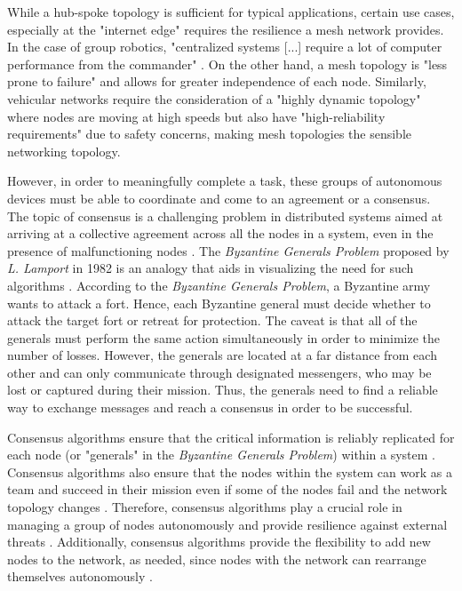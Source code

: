 While a hub-spoke topology is sufficient for typical applications, certain use cases, especially at the "internet edge" \cite{howardCoracleEvaluatingConsensus2015} requires the resilience a mesh network provides. In the case of group robotics, "centralized systems [...] require a lot of computer performance from the commander" \cite{manet_drone_semenova2015network}. On the other hand, a mesh topology is "less prone to failure" \cite{manet_drone_semenova2015network} and allows for greater independence of each node. Similarly, vehicular networks require the consideration of a "highly dynamic topology" \cite{iov_wu2016internet} where nodes are moving at high speeds but also have "high-reliability requirements" \cite{iov_wu2016internet} due to safety concerns, making mesh topologies the sensible networking topology. 



However, in order to meaningfully complete a task, these groups of autonomous devices must be able to coordinate and come to an agreement or a consensus. The topic of consensus is a challenging problem in distributed systems aimed at arriving at a collective agreement across all the nodes in a system, even in the presence of malfunctioning nodes \cite{Bach_Mihaljevic_Zagar_2018}. The \textit{Byzantine Generals Problem} proposed by \textit{L. Lamport} in 1982 is an analogy that aids in visualizing the need for such algorithms \cite{Lamport_1983}. According to the \textit{Byzantine Generals Problem}, a Byzantine army wants to attack a fort. Hence, each Byzantine general must decide whether to attack the target fort or retreat for protection. The caveat is that all of the generals must perform the same action simultaneously in order to minimize the number of losses. However, the generals are located at a far distance from each other and can only communicate through designated messengers, who may be lost or captured during their mission. Thus, the generals need to find a reliable way to exchange messages and reach a consensus in order to be successful. 

Consensus algorithms ensure that the critical information is reliably replicated for each node (or "generals" in the \textit{Byzantine Generals Problem}) within a system \cite{tsitsiklis1984problems}. Consensus algorithms also ensure that the nodes within the system can work as a team and succeed in their mission even if some of the nodes fail and the network topology changes \cite{raft_paper}. Therefore, consensus algorithms play a crucial role in managing a group of nodes autonomously and provide resilience against external threats \cite{Kar_Moura_2010}. Additionally, consensus algorithms provide the flexibility to add new nodes to the network, as needed, since nodes with the network can rearrange themselves autonomously \cite{Olfati_Saber_Fax_Murray_2007}. 

